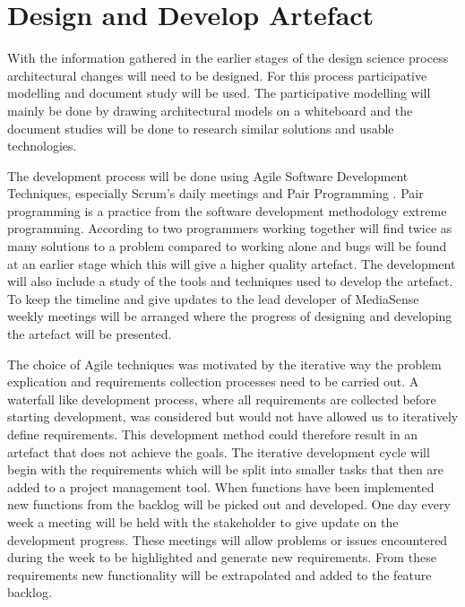 \section{Design and Develop Artefact}
With the information gathered in the earlier stages of the design science process architectural changes will need to be designed. For this process participative modelling \cite{johannesson2012design} and document study will be used. The participative modelling will mainly be done by drawing architectural models on a whiteboard and the document studies will be done to research similar solutions and usable technologies. 

The development process will be done using Agile Software Development Techniques, especially Scrum's daily meetings \cite{kniberg2007scrum} and Pair Programming \cite{williams2000all}. 
Pair programming is a practice from the software development methodology extreme programming. According to  \cite{williams2000all} two programmers working together will find twice as many solutions to a problem compared to working alone and bugs will be found at an earlier stage which this will give a higher quality artefact. The development will also include a study of the tools and techniques used to develop the artefact. To keep the timeline and give updates to the lead developer of MediaSense weekly meetings will be arranged where the progress of designing and developing the artefact will be presented. 


The choice of Agile techniques was motivated by the iterative way the problem explication and requirements collection processes need to be carried out. A waterfall like development process, where all requirements are collected before starting development, was considered but would not have allowed us to iteratively define requirements. This development method could therefore result in an artefact that does not achieve the goals.
The iterative development cycle will begin with the requirements which will be split into smaller tasks that then are added to a project management tool. When functions have been implemented new functions from the backlog will be picked out and developed. One day every week a meeting will be held with the stakeholder to give update on the development progress. These meetings will allow problems or issues encountered during the week to be highlighted and generate new requirements. From these requirements new functionality will be extrapolated and added to the feature backlog. 
